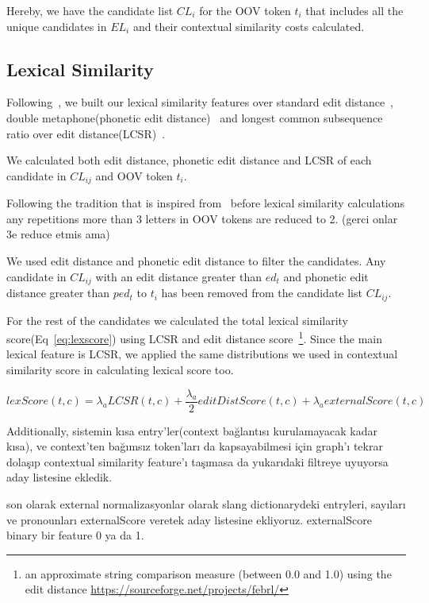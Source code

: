 \documentclass[preprint,review,12pt]{elsarticle}
\begin{document}
Hereby, we have the candidate list $CL_{i}$ for the OOV token $t_i$ that includes all the unique candidates in $EL_{i}$ and their contextual similarity costs calculated.

\subsection{Lexical Similarity}

Following~\cite{Han:2011:LNS:2002472.2002520,DBLP:conf/acl/HassanM13}, we built our lexical similarity features over standard edit distance~\cite{levenshtein1966bcc}, double metaphone(phonetic edit distance)~\cite{Philips:2000:DMS:349124.349132} and longest common subsequence ratio over edit distance(LCSR)~\cite{Contractor:2010:UCN:1944566.1944588}.

We calculated both edit distance, phonetic edit distance and LCSR of each candidate in $CL_{ij}$ and OOV token $t_i$.

Following the tradition that is inspired from~\cite{Kaufmann2010} before lexical similarity calculations any repetitions more than 3 letters in OOV tokens are reduced to 2. (gerci onlar 3e reduce etmis ama)

We used edit distance and phonetic edit distance to filter the candidates. Any candidate in $CL_{ij}$ with an edit distance greater than $ed_t$ and phonetic edit distance greater than $ped_t$ to $t_i$ has been removed from the candidate list $CL_{ij}$.

For the rest of the candidates we calculated the total lexical similarity score(Eq~\ref{eq:lexscore}) using LCSR and edit distance score~\footnote{an approximate string comparison measure (between 0.0 and 1.0) using the edit distance \url{https://sourceforge.net/projects/febrl/}}. Since the main lexical feature is LCSR, we applied the same distributions we used in contextual similarity score in calculating lexical score too.

\begin{equation}
lexScore(t,c) = \lambda_a LCSR(t,c) + \frac{\lambda_a} 2 editDistScore(t,c) + \lambda_a externalScore(t,c)
\label{eq:lexscore}
\end{equation}

Additionally, sistemin kısa entry'ler(context bağlantısı kurulamayacak kadar kısa), ve context'ten bağımsız token'ları da kapsayabilmesi için graph'ı tekrar dolaşıp contextual similarity feature'ı taşımasa da yukarıdaki filtreye uyuyorsa aday listesine ekledik.


son olarak external normalizasyonlar olarak slang dictionarydeki entryleri, sayıları ve pronounları externalScore veretek aday listesine ekliyoruz. externalScore binary bir feature 0 ya da 1.
\end{document}
